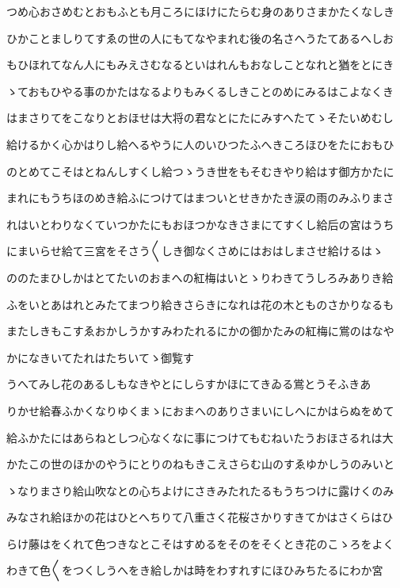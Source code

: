 \documentclass[a4paper,11pt,landscape]{ltjtarticle}
\begin{document}
つめ心おさめむとおもふとも月ころにほけにたらむ身のありさまかたくなしき
\par\medskip
ひかことましりてすゑの世の人にもてなやまれむ後の名さへうたてあるへしお
\par\medskip
もひほれてなん人にもみえさむなるといはれんもおなしことなれと猶をとにき
\par\medskip
ゝておもひやる事のかたはなるよりもみくるしきことのめにみるはこよなくき
\par\medskip
はまさりてをこなりとおほせは大将の君なとにたにみすへたてゝそたいめむし
\par\medskip
給けるかく心かはりし給へるやうに人のいひつたふへきころほひをたにおもひ
\par\medskip
のとめてこそはとねんしすくし給つゝうき世をもそむきやり給はす御方かたに
\par\medskip
まれにもうちほのめき給ふにつけてはまついとせきかたき涙の雨のみふりまさ
\par\medskip
れはいとわりなくていつかたにもおほつかなきさまにてすくし給后の宮はうち
\par\medskip
にまいらせ給て三宮をそさう〱しき御なくさめにはおはしまさせ給けるはゝ
\par\medskip
ののたまひしかはとてたいのおまへの紅梅はいとゝりわきてうしろみありき給
\par\medskip
ふをいとあはれとみたてまつり給きさらきになれは花の木とものさかりなるも
\par\medskip
またしきもこすゑおかしうかすみわたれるにかの御かたみの紅梅に鴬のはなや
\par\medskip
かになきいてたれはたちいてゝ御覧す
\par\medskip
うへてみし花のあるしもなきやとにしらすかほにてきゐる鴬とうそふきあ
\par\medskip
りかせ給春ふかくなりゆくまゝにおまへのありさまいにしへにかはらぬをめて
\par\medskip
給ふかたにはあらねとしつ心なくなに事につけてもむねいたうおほさるれは大
\par\medskip
かたこの世のほかのやうにとりのねもきこえさらむ山のすゑゆかしうのみいと
\par\medskip
ゝなりまさり給山吹なとの心ちよけにさきみたれたるもうちつけに露けくのみ
\par\medskip
みなされ給ほかの花はひとへちりて八重さく花桜さかりすきてかはさくらはひ
\par\medskip
らけ藤はをくれて色つきなとこそはすめるをそのをそくとき花のこゝろをよく
\par\medskip
わきて色〱をつくしうへをき給しかは時をわすれすにほひみちたるにわか宮
\end{document}
